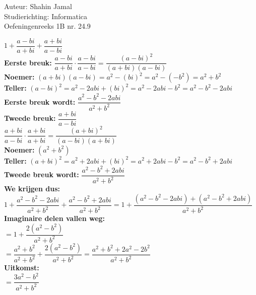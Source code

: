 \documentclass[a4paper]{article}
\begin{document}
\noindent \large Auteur: Shahin Jamal \\  
\noindent \large Studierichting: Informatica\\  
\noindent \large Oefeningenreeks 1B nr. 24.9\\  

\medskip

\normalsize

$1 + \dfrac{a - bi}{a + bi} + \dfrac{a + bi}{a - bi}$\\

\textbf{Eerste breuk:} $\dfrac{a - bi}{a + bi} \cdot \dfrac{a - bi}{a - bi} = \dfrac{(a - bi)^2}{(a + bi)(a - bi)}$\\

\textbf{Noemer:} $(a + bi)(a - bi) = a^2 - (bi)^2 = a^2 - (-b^2) = a^2 + b^2$\\

\textbf{Teller:} $(a - bi)^2 = a^2 - 2abi + (bi)^2 = a^2 - 2abi - b^2 = a^2 - b^2 - 2abi$\\

\textbf{Eerste breuk wordt: }$\dfrac{a^2 - b^2 - 2abi}{a^2 + b^2}$\\

\textbf{Tweede breuk: }$\dfrac{a + bi}{a - bi}$\\

$\dfrac{a + bi}{a - bi} \cdot \dfrac{a + bi}{a + bi} = \dfrac{(a + bi)^2}{(a - bi)(a + bi)}$\\

\textbf{Noemer: }$(a^2 + b^2)$\\

\textbf{Teller: }$(a + bi)^2 = a^2 + 2abi + (bi)^2 = a^2 + 2abi - b^2 = a^2 - b^2 + 2abi$\\

\textbf{Tweede breuk wordt: }$\dfrac{a^2 - b^2 + 2abi}{a^2 + b^2}$\\

\textbf{We krijgen dus:} \\

$1 + \dfrac{a^2 - b^2 - 2abi}{a^2 + b^2} + \dfrac{a^2 - b^2 + 2abi}{a^2 + b^2} = 1 + \dfrac{(a^2 - b^2 - 2abi) + (a^2 - b^2 + 2abi)}{a^2 + b^2}$\\

\textbf{Imaginaire delen vallen weg:} \\

$= 1 + \dfrac{2(a^2 - b^2)}{a^2 + b^2}$\\

$= \dfrac{a^2 + b^2}{a^2 + b^2} + \dfrac{2(a^2 - b^2)}{a^2 + b^2} = \dfrac{a^2 + b^2 + 2a^2 - 2b^2}{a^2 + b^2}$\\

\textbf{Uitkomst:} \\

$= \dfrac{3a^2 - b^2}{a^2 + b^2}$\\
\end{document}
